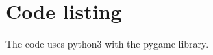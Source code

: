 \documentclass[a4paper,14pt,english,crop=false]{standalone}
\begin{document}
\section{Code listing}
The code uses python3 with the pygame library.

\clearpage{}
\end{document}
